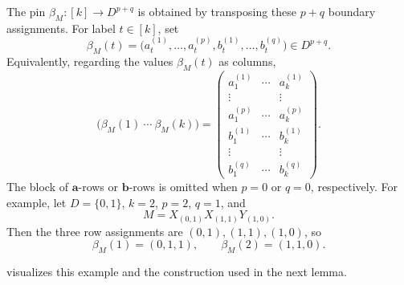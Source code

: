 \documentclass[11pt]{article}
\theoremstyle{plain}
\theoremstyle{definition}
\theoremstyle{remark}
\begin{document}
The pin $\beta_M:[k]\to D^{p+q}$ is obtained by transposing these $p+q$
boundary assignments.  For label $t\in[k]$, set
\[
  \beta_M(t)
  =\bigl(a_t^{(1)},\ldots,a_t^{(p)},
          b_t^{(1)},\ldots,b_t^{(q)}\bigr)\in D^{p+q}.
\]
Equivalently, regarding the values $\beta_M(t)$ as columns,
\begin{equation*}
  \bigl(\beta_M(1)\ \cdots\ \beta_M(k)\bigr)
  =
  \begin{pmatrix}
    a_1^{(1)}&\cdots&a_k^{(1)}\\
    \vdots&&\vdots\\
    a_1^{(p)}&\cdots&a_k^{(p)}\\
    b_1^{(1)}&\cdots&b_k^{(1)}\\
    \vdots&&\vdots\\
    b_1^{(q)}&\cdots&b_k^{(q)}
  \end{pmatrix}.
\end{equation*}
The block of $\mathbf a$-rows or $\mathbf b$-rows is omitted when $p=0$ or
$q=0$, respectively.
For example, let $D=\{0,1\}$, $k=2$, $p=2$, $q=1$, and
\[
  M=X_{(0,1)}X_{(1,1)}Y_{(1,0)}.
\]
Then the three row assignments are $(0,1),(1,1),(1,0)$, so
\[
  \beta_M(1)=(0,1,1),
  \qquad
  \beta_M(2)=(1,1,0).
\]

 visualizes this example and the
construction used in the next lemma.
\end{document}
